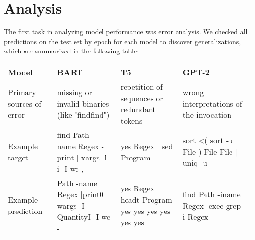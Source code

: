 \section{Analysis}
The first task in analyzing model performance was error analysis. We checked all predictions on the test set by epoch for each model to discover generalizations, which are summarized in the following table:

\begin{center}
	\begin{tabular}{ |M|L|L|L| }
		\hline
		\textbf{Model}                                         & \textbf{BART}                                              & \textbf{T5} & \textbf{GPT-2} \\
		\hline
		Primary sources of error                               &
		missing or invalid binaries (like "findfind")          &
		repetition of sequences or redundant tokens            &
		wrong interpretations of the invocation                                                                                                            \\
		\hline
		Example target                                         & find Path -name Regex -print | xargs -l -i -I {} wc {} {}, &
		yes Regex | sed Program                                &
		sort <( sort -u File ) File File | uniq -u                                                                                                         \\
		\hline
		Example prediction                                     &
		Path -name Regex |print0 wargs -I QuantityI -I {} wc - & yes Regex | headt Program yes yes yes yes yes yes          &
		find Path -iname Regex -exec grep -i Regex {}                                                                                                      \\
		\hline
	\end{tabular}
\end{center}

